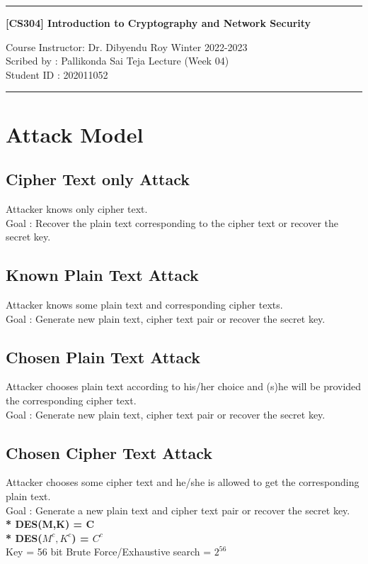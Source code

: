 \documentclass[11pt]{article}
\begin{document}
	\noindent
	\rule{\textwidth}{1pt}
	\begin{center}
		{\bf [CS304] Introduction to Cryptography and Network Security}
	\end{center}
	Course Instructor: Dr. Dibyendu Roy \hfill Winter 2022-2023\\
	Scribed by : Pallikonda Sai Teja  \hfill Lecture (Week 04)\\
	Student ID : 202011052\\
	\rule{\textwidth}{1pt}
	\section{Attack Model}
	\subsection{Cipher Text only Attack}
	Attacker knows only cipher text.\\
	Goal : Recover the plain text corresponding to the cipher text or recover the secret key.
	\subsection{Known Plain Text Attack}
	Attacker knows some plain text and corresponding cipher texts.\\
	Goal : Generate new plain text, cipher text pair or recover the secret key.
	\subsection{Chosen Plain Text Attack}
	Attacker chooses plain text according to his/her choice and (s)he will be provided the corresponding cipher text.\\
	Goal : Generate new plain text, cipher text pair or recover the secret key.
	\subsection{Chosen Cipher Text Attack}
	Attacker chooses some cipher text and he/she is allowed to get the corresponding plain text.\\
	Goal : Generate a new plain text and cipher text pair or recover the secret key. \vspace{0.4cm} \\
	\textbf{\mbox{*} DES(M,K) = C}\\
	\textbf{\mbox{*} DES($M^c,K^c$) = $C^c$}\\
	Key = 56 bit Brute Force/Exhaustive search = $2^{56}$
\end{document}
